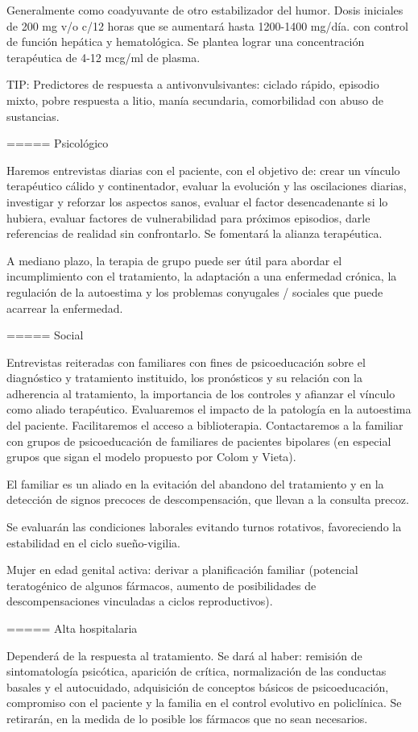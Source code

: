 \documentclass[encares.tex]{subfiles}
\begin{document}
Generalmente como coadyuvante de otro estabilizador del humor. Dosis iniciales de 200 mg v/o c/12 horas que se aumentará hasta 1200-1400 mg/día. con control de función hepática y hematológica. Se plantea lograr una concentración terapéutica de 4-12 mcg/ml de plasma.

TIP: Predictores de respuesta a antivonvulsivantes: ciclado rápido, episodio mixto, pobre respuesta a litio, manía secundaria, comorbilidad con abuso de sustancias.

===== Psicológico

Haremos entrevistas diarias con el paciente, con el objetivo de: crear un vínculo terapéutico cálido y continentador, evaluar la evolución y las oscilaciones diarias, investigar y reforzar los aspectos sanos, evaluar el factor desencadenante si lo hubiera, evaluar factores de vulnerabilidad para próximos episodios, darle referencias de realidad sin confrontarlo. Se fomentará la alianza terapéutica.

A mediano plazo, la terapia de grupo puede ser útil para abordar el incumplimiento con el tratamiento, la adaptación a una enfermedad crónica, la regulación de la autoestima y los problemas conyugales / sociales que puede acarrear la enfermedad.

===== Social

Entrevistas reiteradas con familiares con fines de psicoeducación sobre el diagnóstico y tratamiento instituido, los pronósticos y su relación con la adherencia al tratamiento, la importancia de los controles y afianzar el vínculo como aliado terapéutico. Evaluaremos el impacto de la patología en la autoestima del paciente. Facilitaremos el acceso a biblioterapia. Contactaremos a la familiar con grupos de psicoeducación de familiares de pacientes bipolares (en especial grupos que sigan el modelo propuesto por Colom y Vieta).

El familiar es un aliado en la evitación del abandono del tratamiento y en la detección de signos precoces de descompensación, que llevan a la consulta precoz.

Se evaluarán las condiciones laborales evitando turnos rotativos, favoreciendo la estabilidad en el ciclo sueño-vigilia.

Mujer en edad genital activa: derivar a planificación familiar (potencial teratogénico de algunos fármacos, aumento de posibilidades de descompensaciones vinculadas a ciclos reproductivos).

===== Alta hospitalaria

Dependerá de la respuesta al tratamiento. Se dará al haber: remisión de sintomatología psicótica, aparición de crítica, normalización de las conductas basales y el autocuidado, adquisición de conceptos básicos de psicoeducación, compromiso con el paciente y la familia en el control evolutivo en policlínica. Se retirarán, en la medida de lo posible los fármacos que no sean necesarios.
\end{document}
